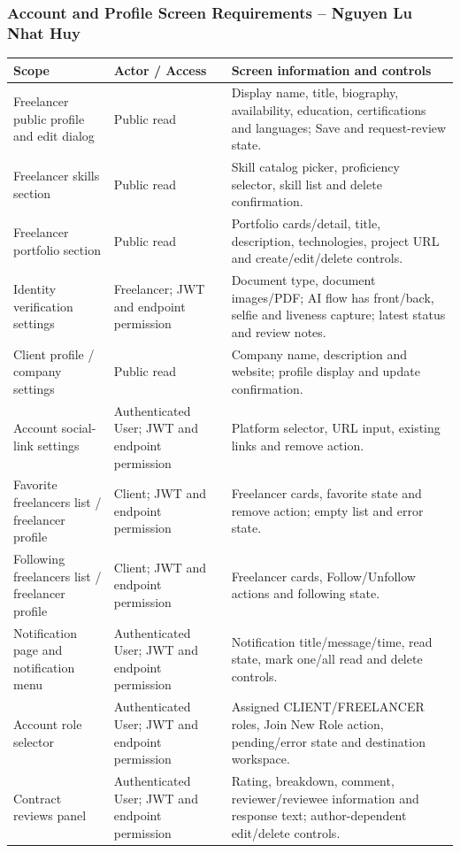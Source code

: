 \subsubsection{Account and Profile Screen Requirements -- Nguyen Lu Nhat Huy}
\begin{longtable}{|L{2.3cm}|L{3.2cm}|L{8.4cm}|}\hline
Scope & Actor / Access & Screen information and controls \\ \hline
Freelancer public profile and edit dialog & Public read & Display name, title, biography, availability, education, certifications and languages; Save and request-review state. \\ \hline
Freelancer skills section & Public read & Skill catalog picker, proficiency selector, skill list and delete confirmation. \\ \hline
Freelancer portfolio section & Public read & Portfolio cards/detail, title, description, technologies, project URL and create/edit/delete controls. \\ \hline
Identity verification settings & Freelancer; JWT and endpoint permission & Document type, document images/PDF; AI flow has front/back, selfie and liveness capture; latest status and review notes. \\ \hline
Client profile / company settings & Public read & Company name, description and website; profile display and update confirmation. \\ \hline
Account social-link settings & Authenticated User; JWT and endpoint permission & Platform selector, URL input, existing links and remove action. \\ \hline
Favorite freelancers list / freelancer profile & Client; JWT and endpoint permission & Freelancer cards, favorite state and remove action; empty list and error state. \\ \hline
Following freelancers list / freelancer profile & Client; JWT and endpoint permission & Freelancer cards, Follow/Unfollow actions and following state. \\ \hline
Notification page and notification menu & Authenticated User; JWT and endpoint permission & Notification title/message/time, read state, mark one/all read and delete controls. \\ \hline
Account role selector & Authenticated User; JWT and endpoint permission & Assigned CLIENT/FREELANCER roles, Join New Role action, pending/error state and destination workspace. \\ \hline
Contract reviews panel & Authenticated User; JWT and endpoint permission & Rating, breakdown, comment, reviewer/reviewee information and response text; author-dependent edit/delete controls. \\ \hline

\end{longtable}
